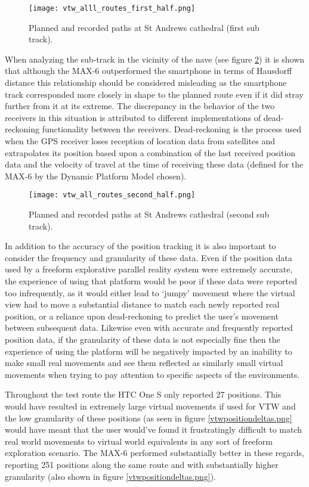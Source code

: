 \begin{figure}[h]
\centering
\texttt{[image: vtw\_alll\_routes\_first\_half.png]}
\caption{Planned and recorded paths at St Andrews cathedral (first sub track).}
\label{vtw_alll_routes_first_half.png}
\end{figure}

When analyzing the sub-track in the vicinity of the nave (see figure \ref{vtw_all_routes_second_half.png}) it is shown that although the MAX-6 outperformed the smartphone in terms of Hausdorff distance this relationship should be considered misleading as the smartphone track corresponded more closely in shape to the planned route even if it did stray further from it at its extreme. The discrepancy in the behavior of the two receivers in this situation is attributed to different implementations of dead-reckoning functionality between the receivers. Dead-reckoning is the process used when the GPS receiver loses reception of location data from satellites and extrapolates its position based upon a combination of the last received position data and the velocity of travel at the time of receiving these data (defined for the MAX-6 by the Dynamic Platform Model chosen).
 
\begin{figure}[h]
\centering
\texttt{[image: vtw\_all\_routes\_second\_half.png]}
\caption{Planned and recorded paths at St Andrews cathedral (second sub track).}
\label{vtw_all_routes_second_half.png}
\end{figure}

In addition to the accuracy of the position tracking it is also important to consider the frequency and granularity of these data. Even if the position data used by a freeform explorative parallel reality system were extremely accurate, the experience of using that platform would be poor if these data were reported too infrequently, as it would either lead to `jumpy' movement where the virtual view had to move a substantial distance to match each newly reported real position, or a reliance upon dead-reckoning to predict the user's movement between subsequent data. Likewise even with accurate and frequently reported position data, if the granularity of these data is not especially fine then the experience of using the platform will be negatively impacted by an inability to make small real movements and see them reflected as similarly small virtual movements when trying to pay attention to specific aspects of the environments.

Throughout the test route the HTC One S only reported 27 positions. This would have resulted in extremely large virtual movements if used for VTW and the low granularity of these positions (as seen in figure \ref{vtwpositiondeltas.png} would have meant that the user would've found it frustratingly difficult to match real world movements to virtual world equivalents in any sort of freeform exploration scenario. The MAX-6 performed substantially better in these regards, reporting 251 positions along the same route and with substantially higher granularity (also shown in figure \ref{vtwpositiondeltas.png}).

